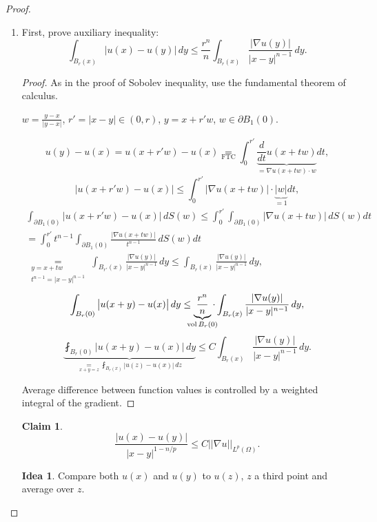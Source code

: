 \documentclass[12pt]{article}
\DeclareMathOperator{\vol}{vol}
\theoremstyle{definition}
\newtheorem*{claim*}{Claim}
\newtheorem*{idea}{Idea}
\begin{document}
\begin{proof}
\begin{enumerate}[label=\alph*)]
\item First, prove auxiliary inequality:
\begin{equation}\tag{A}\label{auxiliary}
\int_{B_r(x)}\big|u(x)-u(y)\big|\,dy\leq\frac{r^n}n\int_{B_r(x)}\frac{|\nabla u(y)|}{|x-y|^{n-1}}\,dy.
\end{equation}

\begin{proof}
As in the proof of Sobolev inequality, use the fundamental theorem of calculus.

$w=\frac{y-x}{|y-x|}$, $r'=|x-y|\in(0,r)$, $y=x+r'w$, $w\in\partial B_1(0)$.

\[u(y)-u(x)=u(x+r'w)-u(x)\underset{\text{FTC}}=\int_0^{r'}\underbrace{\frac d{dt}u(x+tw)}_{=\nabla u(x+tw)\cdot w}dt,\]
\[\big|u(x+r'w)-u(x)\big|\leq\int_0^{r'}\big|\nabla u(x+tw)\big|\cdot\underbrace{|w|}_{=1}dt,\]
\begin{multline*}
\int_{\partial B_1(0)}\big|u(x+r'w)-u(x)\big|\,dS(w)\leq\int_0^{r'}\int_{\partial B_1(0)}\big|\nabla u(x+tw)\big|\,dS(w)dt\\
=\int_0^{r'}t^{n-1}\int_{\partial B_1(0)}\frac{\big|\nabla u(x+tw)\big|}{t^{n-1}}\,dS(w)dt\\
\underset{\substack{y=x+tw\\t^{n-1}=|x-y|^{n-1}}}=\int_{B_{r'}(x)}\frac{|\nabla u(y)|}{|x-y|^{n-1}}\,dy\leq\int_{B_r(x)}\frac{|\nabla u(y)|}{|x-y|^{n-1}}\,dy,
\end{multline*}
\[\int_{B_r(0)}\big|u(x+y)-u(x)\big|\,dy\leq\underbrace{\frac{r^n}n}_{\mathclap{\vol B_r(0)}}\cdot\int_{B_r(x)}\frac{|\nabla u(y)|}{|x-y|^{n-1}}\,dy,\]
\begin{equation}\tag{A$'$}\label{auxiliary_average}
\underbrace{\fint_{B_r(0)}\big|u(x+y)-u(x)\big|\,dy}_{\underset{x+y=z}=\fint_{B_r(x)}|u(z)-u(x)|\,dz}\leq C\int_{B_r(x)}\frac{|\nabla u(y)|}{|x-y|^{n-1}}\,dy.
\end{equation}

Average difference between function values is controlled by a weighted integral of the gradient.
\end{proof}

\begin{claim*}
\[\frac{\big|u(x)-u(y)\big|}{|x-y|^{1-n/p}}\leq C||\nabla u||_{L^p(\Omega)}.\]
\end{claim*}

\begin{idea}
Compare both $u(x)$ and $u(y)$ to $u(z)$, $z$ a third point and average over $z$.
\end{idea}


\end{enumerate}
\end{proof}
\end{document}
